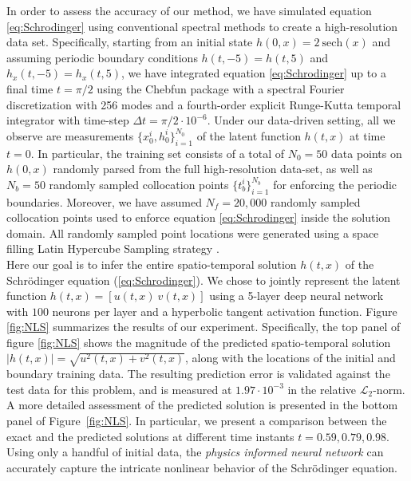\documentclass[preprint,12pt]{elsarticle}
\begin{document}
In order to assess the accuracy of our method, we have simulated equation \eqref{eq:Schrodinger} using conventional spectral methods to create a high-resolution data set. Specifically, starting from an initial state $h(0,x) = 2\ \text{sech}(x)$ and assuming periodic boundary conditions $h(t,-5) = h(t,5)$ and $h_x(t,-5) = h_x(t,5)$, we have integrated equation \eqref{eq:Schrodinger} up to a final time $t=\pi/2$ using the Chebfun package \cite{driscoll2014chebfun} with a spectral Fourier discretization with 256 modes and a fourth-order explicit Runge-Kutta temporal integrator with time-step $\Delta{t} = \pi/2 \cdot 10^{-6}$. Under our data-driven setting, all we observe are measurements $\{x_0^i, h^i_0\}_{i=1}^{N_0}$ of the latent function $h(t,x)$ at time $t=0$. In particular, the training set consists of a total of $N_0 = 50$ data points on $h(0,x)$ randomly parsed from the full high-resolution data-set, as well as $N_b = 50$ randomly sampled collocation points $\{t^i_b\}_{i=1}^{N_b}$ for enforcing the periodic boundaries. Moreover, we have assumed $N_f=20,000$ randomly sampled collocation points used to enforce equation \eqref{eq:Schrodinger} inside the solution domain. All randomly sampled point locations were generated using a space filling Latin Hypercube Sampling strategy \cite{stein1987large}.\\

Here our goal is to infer the entire spatio-temporal solution $h(t,x)$ of the Schr\"{o}dinger equation (\ref{eq:Schrodinger}). We chose to jointly represent the latent function $h(t,x) = [u(t,x)\ v(t,x)]$ using a 5-layer deep neural network with $100$ neurons per layer and a hyperbolic tangent activation function. Figure \ref{fig:NLS} summarizes the results of our experiment. Specifically, the top panel of figure \ref{fig:NLS} shows the magnitude of the predicted spatio-temporal solution $|h(t,x)|=\sqrt{u^2(t,x) + v^2(t,x)}$, along with the locations of the initial and boundary training data. The resulting prediction error is validated against the test data for this problem, and is measured at $1.97 \cdot 10^{-3}$ in the relative $\mathcal{L}_2$-norm. A more detailed assessment of the predicted solution is presented in the bottom panel of Figure~\ref{fig:NLS}. In particular, we present a comparison between the exact and the predicted solutions at different time instants $t=0.59,0.79,0.98$. Using only a handful of initial data, the {\em physics informed neural network} can accurately capture the intricate nonlinear behavior of the Schr\"{o}dinger equation.\\
\end{document}
